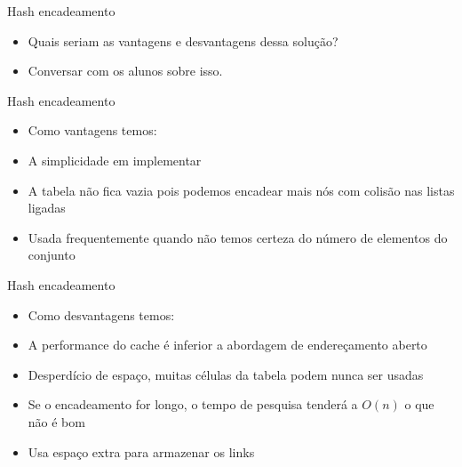 \begin{frame}
	\begin{block}{Hash encadeamento}
		\begin{itemize}
			\item Quais seriam as vantagens e desvantagens dessa solução?
 
			\item Conversar com os alunos sobre isso.
		\end{itemize}
	\end{block}
\end{frame}

\begin{frame}
	\begin{block}{Hash encadeamento}
		\begin{itemize}
			\item Como vantagens temos:
			
			\item A simplicidade em implementar	
			
			\item A tabela não fica vazia pois podemos encadear mais nós com colisão nas listas ligadas	
			
			\item Usada frequentemente quando não temos certeza do número de elementos do conjunto
		\end{itemize}
	\end{block}
\end{frame}



\begin{frame}
	\begin{block}{Hash encadeamento}
		\begin{itemize}
			\item Como desvantagens temos:
			
			\item A performance do cache é inferior a abordagem de endereçamento aberto
				
			\item Desperdício de espaço, muitas células da tabela podem nunca ser usadas
				
			\item Se o encadeamento for longo, o tempo de  pesquisa tenderá a $O(n)$ o que não é bom
		
			\item Usa espaço extra para armazenar os links
		\end{itemize}
	\end{block}
\end{frame}


